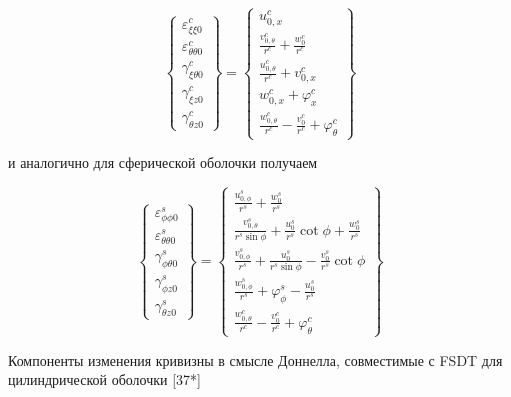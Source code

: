 \begin{equation}
\label{eq:vibro1:5}
\begin{Bmatrix}
		\varepsilon_{\xi \xi 0}^{c} \\
		\varepsilon_{\theta \theta 0}^{c} \\
		\gamma_{\xi \theta 0}^{c} \\
		\gamma_{\xi z 0}^{c} \\
		\gamma_{\theta z 0}^{c}
\end{Bmatrix} =
\begin{Bmatrix}
		u_{0, x}^c \\
		\frac{v_{0, \theta}^c}{r^c}+\frac{w_{0}^c}{r^c} \\
		\frac{u_{0, \theta}^c}{r^c}+v_{0, x}^c \\
		w_{0,x}^c+\varphi_{x}^c \\
		\frac{w_{0,\theta}^c}{r^c}-\frac{v_{0}^c}{r^c} + \varphi_{\theta}^c
\end{Bmatrix}
\end{equation}


и аналогично для сферической оболочки получаем

\begin{equation}
	\label{eq:vibro1:6}
	\begin{Bmatrix}
		\varepsilon_{\phi \phi 0}^{s} \\
		\varepsilon_{\theta \theta 0}^{s} \\
		\gamma_{\phi \theta 0}^{s} \\
		\gamma_{\phi z 0}^{s} \\
		\gamma_{\theta z 0}^{s}
	\end{Bmatrix} =
	\begin{Bmatrix}
		\frac{u_{0, \phi}^s}{r^s}+\frac{w_{0}^s}{r^s} \\
		\frac{v_{0, \theta}^s}{r^s \sin{\phi}}+\frac{u_{0}^s}{r^s} \cot{\phi}+\frac{w_0^s}{r^s} \\
		\frac{v_{0, \phi}^s}{r^s} +\frac{u_{0}^s}{r^s \sin{\phi}} -\frac{v_0^s}{r^s}\cot{\phi}\\
		\frac{w_{0, \phi}^s}{r^s} +\varphi_{\phi}^s -\frac{u_0^s}{r^s} \\
		\frac{w_{0,\theta}^c}{r^c}-\frac{v_{0}^c}{r^c} + \varphi_{\theta}^c
	\end{Bmatrix}
\end{equation}

Компоненты изменения кривизны в смысле Доннелла, совместимые с FSDT для цилиндрической оболочки [37*]

